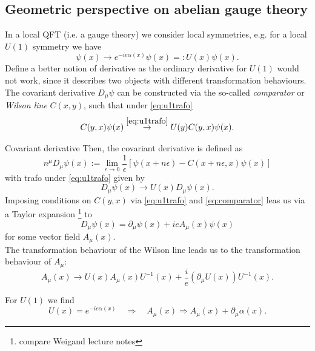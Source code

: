 \subsection{Geometric perspective on abelian gauge theory}
In a local QFT (i.e. a gauge theory) we consider local symmetries, e.g. for a local $U(1)$ symmetry we have
\begin{equation}
\label{eq:u1trafo}
	\psi(x) \rightarrow e^{-i e \alpha(x)} \psi(x) =: U(x) \psi(x). 
\end{equation}
Define a better notion of derivative as the ordinary derivative for $U(1)$ would not work, since it describes two objects with different transformation behaviours. The covariant derivative $D_\mu\psi$ can be constructed via the so-called \emph{comparator} or \emph{Wilson line} $C(x,y)$, such that under \ref{eq:u1trafo}
\begin{equation}
\label{eq:comparator}
C(y,x) \psi(x) \stackrel{\ref{eq:u1trafo}}{\rightarrow} U(y) C(y,x) \psi(x).
\end{equation}
\begin{mybox}{Covariant derivative}
	Then, the covariant derivative is defined as 
	\begin{equation}
		n^\mu D_\mu \psi(x) := \lim_{\epsilon\rightarrow0} \frac{1}{\epsilon}\left[\psi(x+n\epsilon) - C(x+n \epsilon,x) \psi(x)\right]
	\end{equation}
	with trafo under \ref{eq:u1trafo} given by
	\begin{equation}
		D_\mu \psi(x) \rightarrow U(x) D_\mu \psi(x).
	\end{equation}
	Imposing conditions on $C(y,x)$ via \ref{eq:u1trafo} and \ref{eq:comparator} leas us via a Taylor expansion \footnote{compare Weigand lecture notes} to
	\begin{equation}
		\label{eq:gaugecovariantderivative}
		D_\mu \psi(x) = \partial_\mu \psi(x) + i e A_\mu (x) \psi(x)
	\end{equation}
	for some vector field $A_\mu(x)$. \\
	The transformation behaviour of the Wilson line leads us to the transformation behaviour of $A_\mu$:
	\begin{equation}
		A_\mu(x) \rightarrow U(x) A_\mu(x) U^{-1}(x) + \frac{i}{e} (\partial_\mu U(x)) U^{-1}(x).
	\end{equation}
\end{mybox}
For $U(1)$ we find 
\begin{equation}
	U(x) = e^{-i e \alpha(x)} \quad \Rightarrow \quad  A_\mu(x)\Rightarrow A_\mu(x) + \partial_\mu \alpha(x).
\end{equation}
